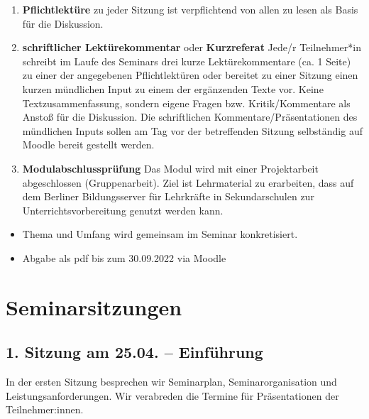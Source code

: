 \documentclass[
  ngerman,
]{article}
\providecommand{\tightlist}{%
  \setlength{\itemsep}{0pt}\setlength{\parskip}{0pt}}
\begin{document}
\begin{enumerate}
\def\labelenumi{\arabic{enumi}.}
\item
  \textbf{Pflichtlektüre} zu jeder Sitzung ist verpflichtend von allen zu lesen als Basis für die Diskussion.
\item
  \textbf{schriftlicher Lektürekommentar} oder \textbf{Kurzreferat} Jede/r Teilnehmer*in schreibt im Laufe des Seminars drei kurze Lektürekommentare (ca. 1 Seite) zu einer der angegebenen Pflichtlektüren oder bereitet zu einer Sitzung einen kurzen mündlichen Input zu einem der ergänzenden Texte vor. Keine Textzusammenfassung, sondern eigene Fragen bzw. Kritik/Kommentare als Anstoß für die Diskussion. Die schriftlichen Kommentare/Präsentationen des mündlichen Inputs sollen am Tag vor der betreffenden Sitzung selbständig auf Moodle bereit gestellt werden.
\item
  \textbf{Modulabschlussprüfung} Das Modul wird mit einer Projektarbeit abgeschlossen (Gruppenarbeit). Ziel ist Lehrmaterial zu erarbeiten, dass auf dem Berliner Bildungsserver für Lehrkräfte in Sekundarschulen zur Unterrichtsvorbereitung genutzt werden kann.
\end{enumerate}

\begin{itemize}
\tightlist
\item
  Thema und Umfang wird gemeinsam im Seminar konkretisiert.
\item
  Abgabe als pdf bis zum 30.09.2022 via Moodle
\end{itemize}

\pagebreak

\hypertarget{seminarsitzungen}{%
\section*{Seminarsitzungen}\label{seminarsitzungen}}

\hypertarget{sitzung-am-25.04.-einfuxfchrung}{%
\subsection*{1. Sitzung am 25.04. -- Einführung}\label{sitzung-am-25.04.-einfuxfchrung}}

In der ersten Sitzung besprechen wir Seminarplan, Seminarorganisation und Leistungsanforderungen. Wir verabreden die Termine für Präsentationen der Teilnehmer:innen.
\end{document}
